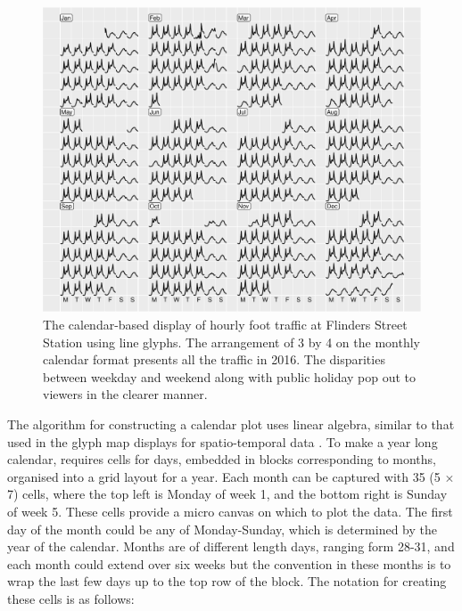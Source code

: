 \documentclass[article]{jss}
\begin{document}
\begin{CodeChunk}
\begin{figure}

{\centering \includegraphics[width=\textwidth]{figure/flinders-2016-1} 

}

\caption[The calendar-based display of hourly foot traffic at Flinders Street Station using line glyphs]{The calendar-based display of hourly foot traffic at Flinders Street Station using line glyphs. The arrangement of 3 by 4 on the monthly calendar format presents all the traffic in 2016. The disparities between weekday and weekend along with public holiday pop out to viewers in the clearer manner.}\label{fig:flinders-2016}
\end{figure}
\end{CodeChunk}

The algorithm for constructing a calendar plot uses linear algebra,
similar to that used in the glyph map displays for spatio-temporal data
\citep{Wickham2012glyph}. To make a year long calendar, requires cells
for days, embedded in blocks corresponding to months, organised into a
grid layout for a year. Each month can be captured with 35 (5 \(\times\)
7) cells, where the top left is Monday of week 1, and the bottom right
is Sunday of week 5. These cells provide a micro canvas on which to plot
the data. The first day of the month could be any of Monday-Sunday,
which is determined by the year of the calendar. Months are of different
length days, ranging form 28-31, and each month could extend over six
weeks but the convention in these months is to wrap the last few days up
to the top row of the block. The notation for creating these cells is as
follows:
\end{document}
